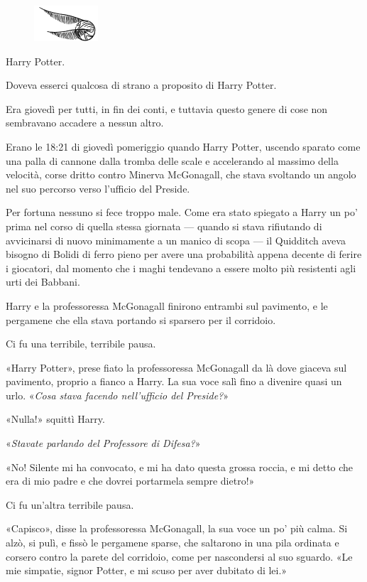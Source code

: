 \begin{figure}[h!]
        \includegraphics[scale=0.4]{boccino.png}
        \centering
\end{figure}

Harry Potter.

Doveva esserci qualcosa di strano a proposito di Harry Potter.

Era giovedì per tutti, in fin dei conti, e tuttavia questo genere di cose non sembravano accadere a nessun altro.

Erano le 18:21 di giovedì pomeriggio quando Harry Potter, uscendo sparato come una palla di cannone dalla tromba delle scale e accelerando al massimo della velocità, corse dritto contro Minerva McGonagall, che stava svoltando un angolo nel suo percorso verso l’ufficio del Preside.

Per fortuna nessuno si fece troppo male. Come era stato spiegato a Harry un po’ prima nel corso di quella stessa giornata — quando si stava rifiutando di avvicinarsi di nuovo minimamente a un manico di scopa — il Quidditch aveva bisogno di Bolidi di ferro pieno per avere una probabilità appena decente di ferire i giocatori, dal momento che i maghi tendevano a essere molto più resistenti agli urti dei Babbani.

Harry e la professoressa McGonagall finirono entrambi sul pavimento, e le pergamene che ella stava portando si sparsero per il corridoio.

Ci fu una terribile, terribile pausa.

«Harry Potter», prese fiato la professoressa McGonagall da là dove giaceva sul pavimento, proprio a fianco a Harry. La sua voce salì fino a divenire quasi un urlo. «\textit{Cosa stava facendo nell’ufficio del Preside?}»

«Nulla!» squittì Harry.

«\textit{Stavate parlando del Professore di Difesa?}»

«No! Silente mi ha convocato, e mi ha dato questa grossa roccia, e mi detto che era di mio padre e che dovrei portarmela sempre dietro!»

Ci fu un’altra terribile pausa.

«Capisco», disse la professoressa McGonagall, la sua voce un po’ più calma. Si alzò, si pulì, e fissò le pergamene sparse, che saltarono in una pila ordinata e corsero contro la parete del corridoio, come per nascondersi al suo sguardo. «Le mie simpatie, signor Potter, e mi scuso per aver dubitato di lei.»

